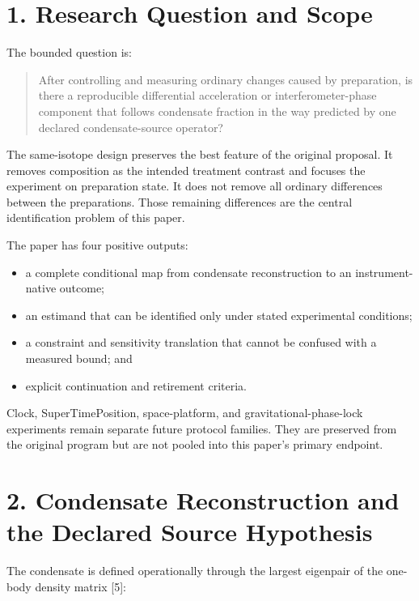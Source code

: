 \documentclass[
  american,
  11pt,
  letterpaper,
]{article}
\providecommand{\tightlist}{%
  \setlength{\itemsep}{0pt}\setlength{\parskip}{0pt}}
\begin{document}
\section{1. Research Question and Scope}\label{research-question-and-scope}

The bounded question is:

\begin{quote}
After controlling and measuring ordinary changes caused by preparation, is there a reproducible differential acceleration or interferometer-phase component that follows condensate fraction in the way predicted by one declared condensate-source operator?
\end{quote}

The same-isotope design preserves the best feature of the original proposal. It removes composition as the intended treatment contrast and focuses the experiment on preparation state. It does not remove all ordinary differences between the preparations. Those remaining differences are the central identification problem of this paper.

The paper has four positive outputs:

\begin{itemize}
\tightlist
\item
  a complete conditional map from condensate reconstruction to an instrument-native outcome;
\item
  an estimand that can be identified only under stated experimental conditions;
\item
  a constraint and sensitivity translation that cannot be confused with a measured bound; and
\item
  explicit continuation and retirement criteria.
\end{itemize}

Clock, SuperTimePosition, space-platform, and gravitational-phase-lock experiments remain separate future protocol families. They are preserved from the original program but are not pooled into this paper's primary endpoint.

\section{2. Condensate Reconstruction and the Declared Source Hypothesis}\label{condensate-reconstruction-and-the-declared-source-hypothesis}

The condensate is defined operationally through the largest eigenpair of the one-body density matrix {[}5{]}:
\end{document}
